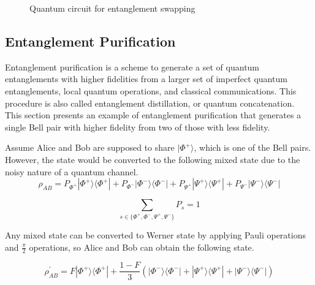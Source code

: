 \begin{figure}[ht]
  \begin{center}
\caption{Quantum circuit for entanglement swapping}
\end{center}
\end{figure}

\subsection{Entanglement Purification}

Entanglement purification is a scheme to generate a set of quantum entanglements with higher fidelities from a larger set of imperfect quantum entanglements, local quantum operations, and classical communications.
This procedure is also called entanglement distillation, or quantum concatenation. This section presents an example of entanglement purification that generates a single Bell pair with higher fidelity from two of those with less fidelity.

Assume Alice and Bob are supposed to share $|\Phi^+\rangle$, which is one of the Bell pairs. However, the state would be converted to the following mixed state due to the noisy nature of a quantum channel.
$$ \rho_{AB} = P_{\Phi^+}|\Phi^+\rangle\langle\Phi^+| + P_{\Phi^-}|\Phi^-\rangle\langle\Phi^-| + P_{\Psi^+}|\Psi^+\rangle\langle\Psi^+| + P_{\Psi^-}|\Psi^-\rangle\langle\Psi^-|$$

$$\sum_{s \in \{\Phi^+, \Phi^-, \Psi^+, \Psi^- \}} P_{s} = 1$$

Any mixed state can be converted to Werner state by applying Pauli operations and $\frac{\pi}{2}$ operations, so Alice and Bob can obtain the following state.

$$ \rho^{'}_{AB} = F|\Phi^+\rangle\langle\Phi^+| + \frac{1-F}{3}(|\Phi^-\rangle\langle\Phi^-| + |\Psi^+\rangle\langle\Psi^+| + |\Psi^-\rangle\langle\Psi^-|)$$


